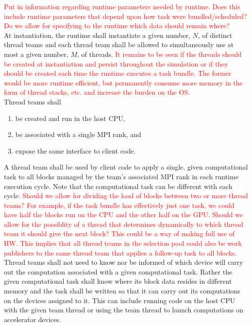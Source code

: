 \documentclass{article}
\begin{document}
\textcolor{red}{Put in information regarding runtime parameters needed by
runtime.  Does this include runtime parameters that depend upon how task were
bundled/scheduled?}\\

\textcolor{red}{Do we allow for specifying to the runtime which data should
remain where?}\\

At instantiation, the runtime shall instantiate a given number, $N$, of distinct
thread teams and each thread team shall be allowed to simultaneously use
at most a given number, $M$, of threads.  \textcolor{red}{It remains to be seen
if the threads should be created at instantiation and persist throughout the
simulation or if they should be created each time the runtime executes a task
bundle.  The former would be more runtime efficient, but permanently consume
more memory in the form of thread stacks, etc. and increase the burden on the
OS.}\\

Thread teams shall
\begin{enumerate}
\item{be created and run in the host CPU,}
\item{be associated with a single MPI rank, and}
\item{expose the same interface to client code.}
\end{enumerate}

A thread team shall be used by client code to apply a single, given
computational task to all blocks managed by the team's associated MPI rank in
each runtime execution cycle.  Note that the computational task can be different
with each cycle.  \textcolor{red}{Should we allow for dividing the load of blocks
between two or more thread teams?  For example, if the task bundle
has effectively just one task, we could have half the blocks run on the CPU and
the other half on the GPU.  Should we allow for the possiblity of a thread that
determines dynamically to which thread team it should give the next block?  This
could be a way of making full use of HW.  This implies that all thread teams in
the selection pool could also be work publishers to the same thread team that
applies a follow-up task to all blocks.}\\

Thread teams shall not need to know nor be informed of which device will carry
out the computation associated with a given computational task.  Rather the
given computational task shall know where its block data resides in different
memory and the task shall be written so that it can carry out its computations
on the devices assigned to it.  This can include running code on the host CPU
with the given team thread or using the team thread to launch computations on
accelerator devices.\\
\end{document}
